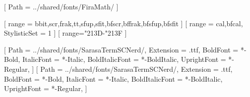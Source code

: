 



[
    Path = ../shared/fonts/FiraMath/
]


[ %
    range = {bbit,scr,frak,tt,sfup,sfit,bfscr,bffrak,bfsfup,bfsfit}
]
[ %
    range = {cal,bfcal},
    StylisticSet = 1
]
[ %
    range={"213D-"213F} %
]


\usepackage{fontspec}
\setmainfont{SarasaTermSCNerd}[ %
    Path = ../shared/fonts/SarasaTermSCNerd/,
    Extension = .ttf,
    BoldFont = *-Bold,
    ItalicFont = *-Italic,
    BoldItalicFont = *-BoldItalic,
    UprightFont = *-Regular,
]
\setsansfont{SarasaTermSCNerd}[
    Path = ../shared/fonts/SarasaTermSCNerd/,
    Extension = .ttf,
    BoldFont = *-Bold,
    ItalicFont = *-Italic,
    BoldItalicFont = *-BoldItalic,
    UprightFont = *-Regular,
]


